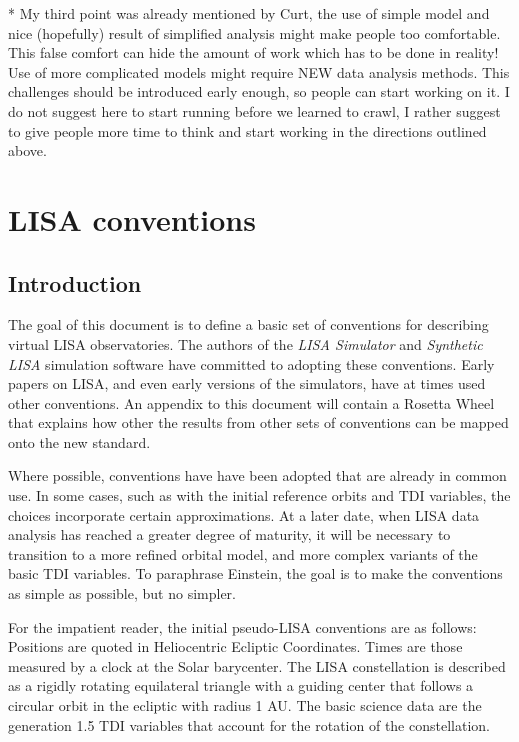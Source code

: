 \documentclass[11pt]{report}
\begin{document}
* My third point was already mentioned by Curt, the use of simple model and nice (hopefully) result of simplified analysis might make people too comfortable. This false comfort can hide the amount of work which has to be done in reality! Use of more complicated models might require NEW data analysis methods. This challenges should be introduced early enough, so people can start working on it. I do not suggest here to start running before we learned to crawl, I rather suggest to give people more time to think and start working in the directions outlined above.

\chapter{LISA conventions}

\section{Introduction}
\label{sec:intro}

The goal of this document is to define a basic set of conventions for describing virtual LISA observatories.
The authors of the \emph{LISA Simulator} and \emph{Synthetic LISA} simulation software have committed to
adopting these conventions. Early papers on LISA, and even early versions of the simulators, have at times
used other conventions. An appendix to this document will contain a Rosetta Wheel that explains how other
the results from other sets of conventions can be mapped onto the new standard.

Where possible, conventions have have been adopted that are already in common use. In some cases, such as with the
initial reference orbits and TDI variables, the choices incorporate certain approximations.
At a later date, when LISA data analysis has reached a greater degree of maturity, it will be necessary to
transition to a more refined orbital model, and more complex variants of the basic TDI variables. To paraphrase
Einstein, the goal is to make the conventions as simple as possible, but no simpler.

For the impatient reader, the initial pseudo-LISA conventions are as follows: Positions are quoted in 
Heliocentric Ecliptic Coordinates. Times are those measured by a clock at the Solar barycenter. The
LISA constellation is described as a rigidly rotating equilateral triangle with a guiding center
that follows a circular orbit in the ecliptic with radius 1 AU. The basic science data are the
generation 1.5 TDI variables that account for the rotation of the constellation.
\end{document}
